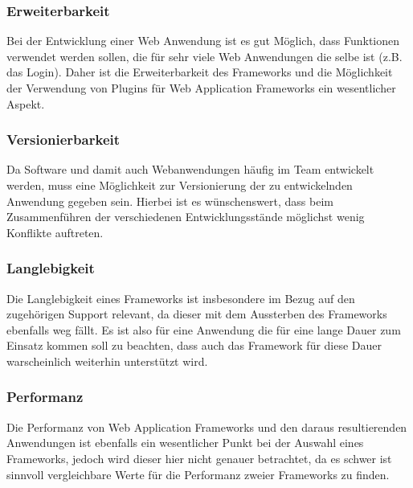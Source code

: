 \subsubsection*{Erweiterbarkeit}
Bei der Entwicklung einer Web Anwendung ist es gut Möglich, dass Funktionen verwendet werden sollen, die für sehr viele Web Anwendungen die selbe ist (z.B. das Login). Daher ist die Erweiterbarkeit des Frameworks und die Möglichkeit der Verwendung von Plugins für Web Application Frameworks ein wesentlicher Aspekt.
\subsubsection*{Versionierbarkeit}
Da Software und damit auch Webanwendungen häufig im Team entwickelt werden, muss eine Möglichkeit zur Versionierung der zu entwickelnden Anwendung gegeben sein. Hierbei ist es wünschenswert, dass beim Zusammenführen der verschiedenen Entwicklungsstände möglichst wenig Konflikte auftreten.
\subsubsection*{Langlebigkeit}
Die Langlebigkeit eines Frameworks ist insbesondere im Bezug auf den zugehörigen Support relevant, da dieser mit dem Aussterben des Frameworks ebenfalls weg fällt. Es ist also für eine Anwendung die für eine lange Dauer zum Einsatz kommen soll zu beachten, dass auch das Framework für diese Dauer warscheinlich weiterhin unterstützt wird.
\subsubsection*{Performanz}
Die Performanz von Web Application Frameworks und den daraus resultierenden Anwendungen ist ebenfalls ein wesentlicher Punkt bei der Auswahl eines Frameworks, jedoch wird dieser hier nicht genauer betrachtet, da es schwer ist sinnvoll vergleichbare Werte für die Performanz zweier Frameworks zu finden.
